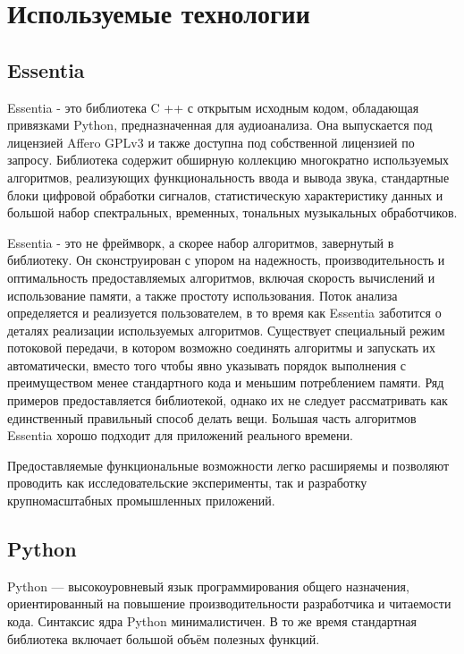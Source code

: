 \section{Используемые технологии}
\label{sec:development}

\subsection{Essentia}
\label{sec:development:essentia}

Essentia - это библиотека C ++ с открытым исходным кодом, обладающая привязками Python, предназначенная для аудиоанализа. Она выпускается под лицензией Affero GPLv3 и также доступна под собственной лицензией по запросу. Библиотека содержит обширную коллекцию многократно используемых алгоритмов, реализующих функциональность ввода и вывода звука, стандартные блоки цифровой обработки сигналов, статистическую характеристику данных и большой набор спектральных, временных, тональных музыкальных обработчиков.

Essentia - это не фреймворк, а скорее набор алгоритмов, завернутый в библиотеку. Он сконструирован с упором на надежность, производительность и оптимальность предоставляемых алгоритмов, включая скорость вычислений и использование памяти, а также простоту использования. Поток анализа определяется и реализуется пользователем, в то время как Essentia заботится о деталях реализации используемых алгоритмов. Существует специальный режим потоковой передачи, в котором возможно соединять алгоритмы и запускать их автоматически, вместо того чтобы явно указывать порядок выполнения с преимуществом менее стандартного кода и меньшим потреблением памяти. Ряд примеров предоставляется библиотекой, однако их не следует рассматривать как единственный правильный способ делать вещи. Большая часть алгоритмов Essentia хорошо подходит для приложений реального времени.

Предоставляемые функциональные возможности легко расширяемы и позволяют проводить как исследовательские эксперименты, так и разработку крупномасштабных промышленных приложений.

\subsection{Python}
\label{sec:development:python}

Python — высокоуровневый язык программирования общего назначения, ориентированный на повышение производительности разработчика и читаемости кода. Синтаксис ядра Python минималистичен. В то же время стандартная библиотека включает большой объём полезных функций.

